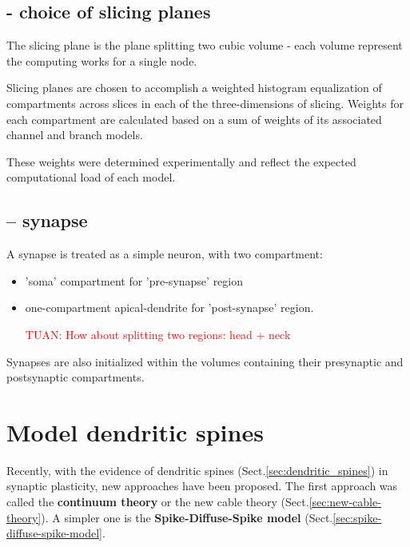 \subsection{- choice of slicing planes}
\label{sec:kozloski2011-slicing-plane}

The slicing plane is the plane splitting two cubic volume
- each volume represent the computing works for a single node.

Slicing planes are chosen to accomplish a weighted histogram equalization of
compartments across slices in each of the three-dimensions of slicing. Weights
for each compartment are calculated based on a sum of weights of its associated
channel and branch models.

These weights were determined experimentally and reflect the expected
computational load of each model.

\subsection{-- synapse}
\label{sec:kozloski2011-synapse}

A synapse is treated as a simple neuron, with two compartment: 
\begin{itemize}
  \item 'soma' compartment for 'pre-synapse' region
  \item one-compartment apical-dendrite for 'post-synapse' region.
  
  \textcolor{red}{TUAN: How about splitting two regions: head + neck}
\end{itemize}

Synapses are also initialized within the volumes containing their presynaptic
and postsynaptic compartments.



\section{Model dendritic spines}



Recently, with the evidence of dendritic spines
(Sect.\ref{sec:dendritic_spines}) in synaptic plasticity, new approaches have
been proposed. The first approach was called the {\bf continuum theory} or the
new cable theory (Sect.\ref{sec:new-cable-theory}). 
A simpler one is the {\bf Spike-Diffuse-Spike model}
(Sect.\ref{sec:spike-diffuse-spike-model}.



